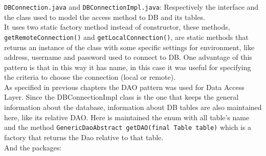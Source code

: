 \documentclass[a4paper,12pt]{report}
\begin{document}
\texttt{DBConnection.java} and \texttt{DBConnectionImpl.java}: Respectively the interface and the class used to model the access method to DB and its tables.\\
It uses two static factory method instead of constructor, these methods, \\ \texttt{getRemoteConnection()} and \texttt{getLocalConnection()}, are static methods that returns an instance of the class with some specific settings for environment, like address, username and password used to connect to DB. One advantage of this pattern is that in this way it has name, in this case it was useful for specifying the criteria to choose the connection (local or remote).\\
As specified in previous chapters the DAO pattern was used for Data Access Layer. Since the DBConnectionImpl class is the one that keeps the general information about the database, information about DB tables are also maintained here, like its relative DAO. Here is maintained the enum with all table's name and the method \texttt{GenericDaoAbstract getDAO(final Table table)} which is a factory that returns the Dao relative to that table.\\

And the packages:\\
\end{document}
